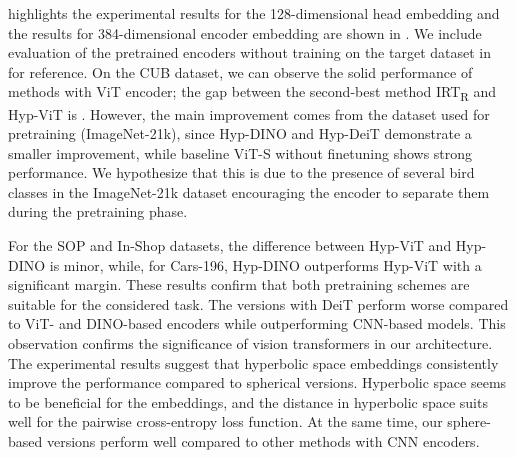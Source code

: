 \documentclass[10pt,twocolumn,letterpaper]{article}
\begin{document}
\begin{table*}
\begin{tabular}{l|c|cccc|cccc|cccc|cccc}
    \bottomrule
  \end{tabular}
  \caption{
    Recall@K metric for four datasets, ``Dim'' column shows the dimensionality of embeddings. The 6 versions of our method are listed in the bottom section, evaluated for encoder embeddings, titles are described in \cref{tab:exp_128}. Encoders by method: A-BIER, ABE, SM: GoogleNet \cite{GoogleNet}; XBM, HTL, MS, SoftTriple, HORDE, Proxy-Anchor: Inception with batch normalization \cite{batch_norm}; NSoftmax, ProxyNCA++: ResNet-50 \cite{resnet}; IRT\textsubscript{R}: DeiT \cite{deit}.
    \textsuperscript{\dag} pretrained encoders without training on the target dataset. \textsuperscript{} pretrained on the larger ImageNet-21k \cite{imagenet}.
    }
  \label{tab:exp_big}
\end{table*}

 highlights the experimental results for the 128-dimensional head embedding and the results for 384-dimensional encoder embedding are shown in . We include evaluation of the pretrained encoders without training on the target dataset in  for reference. On the CUB dataset, we can observe the solid performance of methods with ViT encoder; the gap between the second-best method IRT\textsubscript{R} and Hyp-ViT is . However, the main improvement comes from the dataset used for pretraining (ImageNet-21k), since Hyp-DINO and Hyp-DeiT demonstrate a smaller improvement, while baseline ViT-S without finetuning shows strong performance. We hypothesize that this is due to the presence of several bird classes in the ImageNet-21k dataset encouraging the encoder to separate them during the pretraining phase.

For the SOP and In-Shop datasets, the difference between Hyp-ViT and Hyp-DINO is minor, while, for Cars-196, Hyp-DINO outperforms Hyp-ViT with a significant margin. These results confirm that both pretraining schemes are suitable for the considered task.
The versions with DeiT perform worse compared to ViT- and DINO-based encoders while outperforming CNN-based models. This observation confirms the significance of vision transformers in our architecture.
The experimental results suggest that hyperbolic space embeddings consistently improve the performance compared to spherical versions. Hyperbolic space seems to be beneficial for the embeddings, and the distance in hyperbolic space suits well for the pairwise cross-entropy loss function. At the same time, our sphere-based versions perform well compared to other methods with CNN encoders.
\end{document}
